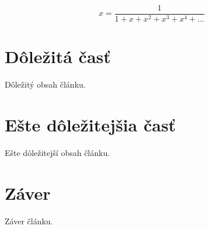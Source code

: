 \documentclass[10pt,twocolumn,twoside,slovak,a4paper]{article}
\begin{document}
\[
x = \frac{1}{1+x+x^2+x^3+x^4+\dots}
\]


\section{Dôležitá časť} \label{dolezita}
Dôležitý obsah článku.

\section{Ešte dôležitejšia časť} \label{dolezitejsia}
Ešte dôležitejší obsah článku.

\section{Záver} \label{zaver}
Záver článku.

\end{document}
